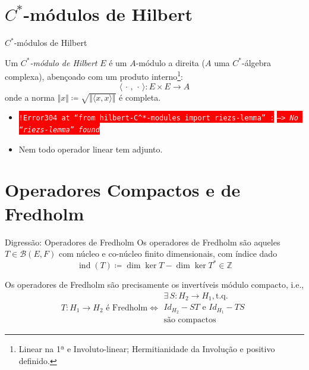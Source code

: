 \documentclass[handout, 9pt, compress]{beamer}
\begin{document}
{\section{\texorpdfstring{\ensuremath{C^*}}{C*}-módulos de Hilbert}
\begin{frame}{\texorpdfstring{\ensuremath{C^*}}{C*}-módulos de Hilbert}
    \begin{definicao}
        Um \textit{$C^*$-módulo de Hilbert} $E$ é um $A$-módulo a direita ($A$ uma $C^*$-álgebra complexa), \pause abençoado com um produto interno\footnote{Linear na 1ª e Involuto-linear; Hermitianidade da Involução e positivo definido.}:
        \begin{equation}
            \langle \,\cdot\,, \,\cdot\,\rangle : E \times E \longrightarrow A
        \end{equation}   
        onde a norma $\Vert x\Vert \coloneqq \sqrt{ \Vert\langle x, x\rangle\Vert}$ é completa.
    \end{definicao}

    \pause

    \begin{observacao}
        \begin{itemize}
            \item \colorbox{red}{\textcolor{white}{\texttt{!Error304 at ``from hilbert-$C^*$-modules import riezs-lemma'' :}}} \colorbox{red}{\textcolor{white}{\texttt{--> \textit{No ``riezs-lemma'' found}}}} \pause 
            \item Nem todo operador linear tem adjunto.
        \end{itemize}
    \end{observacao}
\end{frame}

\section{Operadores Compactos e de Fredholm}

\begin{frame}{Digressão: Operadores de Fredholm}
    Os operadores de Fredholm são aqueles $T \in \mathscr B(E,F)$ com núcleo e co-núcleo finito dimensionais, \pause com índice dado
    \[
    \operatorname{ind}(T) \coloneqq \dim \ker T - \dim \ker T^* \in \mathbb Z    
    \]
    \pause
    \begin{invocacao}
        Os operadores de Fredholm são precisamente os invertíveis módulo compacto, \pause i.e., 
        \[
            T :H_1 \longrightarrow H_2 \text{ é Fredholm}\Longleftrightarrow \begin{array}{c}
                \exists\,S: H_2\longrightarrow H_1, \text{t.q.} \\
                Id_{H_2}-ST \text{ e } Id_{H_1}-TS \\
                \text{são compactos}
            \end{array} 
        \]
    \end{invocacao}
\end{frame}

}
\end{document}
